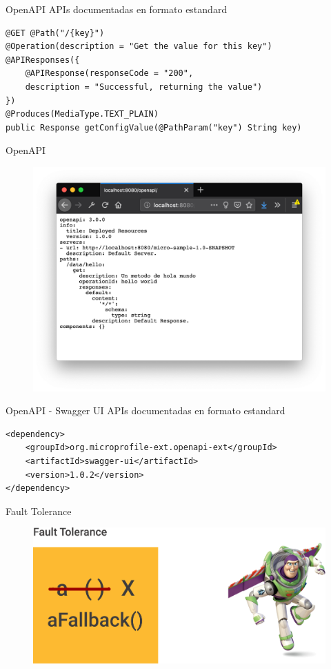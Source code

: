 \documentclass[aspectratio=169]{beamer}
\begin{document}
\begin{frame}[fragile]{OpenAPI}
APIs documentadas en formato estandard
\begin{lstlisting}
@GET @Path("/{key}")
@Operation(description = "Get the value for this key")
@APIResponses({
	@APIResponse(responseCode = "200",
	description = "Successful, returning the value")
})
@Produces(MediaType.TEXT_PLAIN)
public Response getConfigValue(@PathParam("key") String key)
\end{lstlisting}
\end{frame}

\begin{frame}{OpenAPI}
\begin{figure}
	\centering
	\includegraphics[width=0.75\linewidth]{Images/openapi}
\end{figure}
\end{frame}

\begin{frame}[fragile]{OpenAPI - Swagger UI}
APIs documentadas en formato estandard
\begin{lstlisting}
<dependency>
	<groupId>org.microprofile-ext.openapi-ext</groupId>
	<artifactId>swagger-ui</artifactId>
	<version>1.0.2</version>
</dependency>
\end{lstlisting}
\end{frame}

\begin{frame}{Fault Tolerance}
\begin{figure}
	\centering
	\includegraphics[width=0.75\linewidth]{Images/faulttolerance}
\end{figure}
\end{frame}
\end{document}
